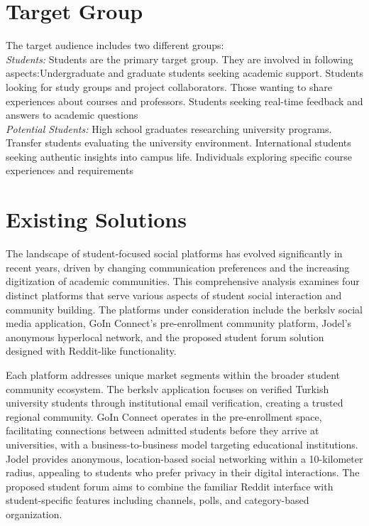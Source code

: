 \section{Target Group}

The target audience includes two different groups: \\
\textit{Students:} Students are the primary target group. 
They are involved in following aspects:Undergraduate and graduate students seeking academic support. 
Students looking for study groups and project collaborators. 
Those wanting to share experiences about courses and professors. 
Students seeking real-time feedback and answers to academic questions \\

\textit{Potential Students:}
High school graduates researching university programs. 
Transfer students evaluating the university environment. 
International students seeking authentic insights into campus life. 
Individuals exploring specific course experiences and requirements 


\section{Existing Solutions}

The landscape of student-focused social platforms has evolved significantly in recent years, driven by changing communication preferences and the increasing digitization of academic communities. This comprehensive analysis examines four distinct platforms that serve various aspects of student social interaction and community building. The platforms under consideration include the berkslv social media application, GoIn Connect's pre-enrollment community platform, Jodel's anonymous hyperlocal network, and the proposed student forum solution designed with Reddit-like functionality.

Each platform addresses unique market segments within the broader student community ecosystem. The berkslv application focuses on verified Turkish university students through institutional email verification, creating a trusted regional community. GoIn Connect operates in the pre-enrollment space, facilitating connections between admitted students before they arrive at universities, with a business-to-business model targeting educational institutions. Jodel provides anonymous, location-based social networking within a 10-kilometer radius, appealing to students who prefer privacy in their digital interactions. The proposed student forum aims to combine the familiar Reddit interface with student-specific features including channels, polls, and category-based organization.

